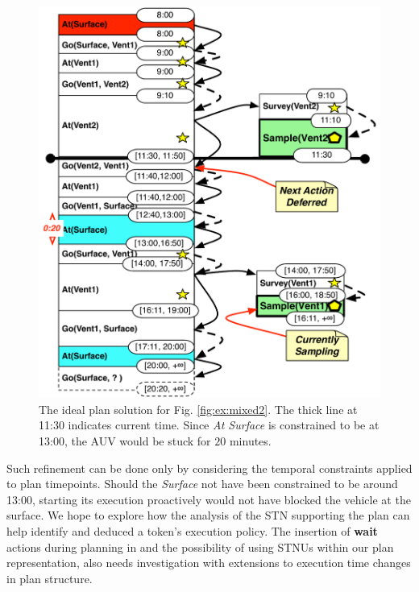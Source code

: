 \begin{figure}[!htb]
  \centering
  \includegraphics[width=0.8\columnwidth]{figs/example_ideal}
  \vskip-3mm
  \caption{\small The ideal plan solution for
    Fig. \ref{fig:ex:mixed2}. The thick line at 11:30 indicates
    current time. Since {\em At Surface} is constrained to be at
    13:00, the AUV would be stuck for $20$ minutes.}
  \label{fig:res:ideal}
  \vskip-3mm
\end{figure}
 
Such refinement can be done only by considering the temporal
constraints applied to plan timepoints. Should the {\em Surface} not
have been constrained to be around 13:00, starting its execution
proactively would not have blocked the vehicle at the surface. We hope
to explore how the analysis of the STN supporting the plan can help 
identify and deduced a token's execution policy. 
The insertion of {\bf wait} actions during
planning in \cite{morris01} and the possibility of using STNUs within
our plan representation, also needs investigation with extensions to
execution time changes in plan structure.

